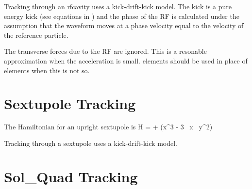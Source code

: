 Tracking through an rfcavity uses a kick-drift-kick model. The kick is
a pure energy kick (see equations in ) and the phase of
the RF is calculated under the assumption that the waveform moves at a
phase velocity equal to the velocity of the reference particle.

The transverse forces due to the RF are ignored. This is a resonable
approximation when the acceleration is small.  elements
should be used in place of  elements when this is not so.

\section{Sextupole Tracking}
\label{s:sextupole.std}

The Hamiltonian for an upright sextupole is
\Begineq
  H =  +  (x^3 - 3 \, x \, y^2)
\Endeq

Tracking through a sextupole uses a kick-drift-kick model.

\section{Sol\_Quad Tracking}
\label{s:sol.quad.std}

